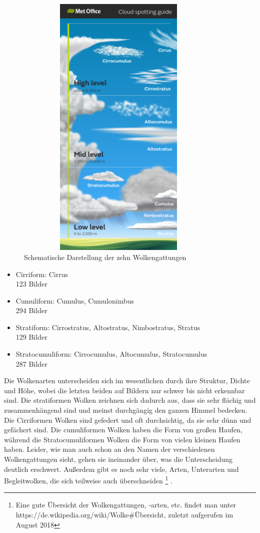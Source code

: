 \documentclass[a4,german]{article}
\begin{document}
\begin{figure}[h!]
\centering
\includegraphics[width=10cm,height=13cm,keepaspectratio]{Cloud_infographic-01.png}
\caption{Schematische Darstellung der zehn Wolkengattungen}
    \label{fig:cloudtypes}
\end{figure}

\begin{itemize}
\item Cirriform: Cirrus\\123 Bilder
\item Cumuliform: Cumulus, Cumulonimbus\\294 Bilder
\item Stratiform: Cirrostratus, Altostratus, Nimbostratus, Stratus\\129 Bilder
\item Stratocumuliform: Cirrocumulus, Altocumulus, Stratocumulus\\287 Bilder
\end{itemize}

Die Wolkenarten unterscheiden sich im wesentlichen durch ihre Struktur, Dichte und Höhe, wobei die letzten beiden auf Bildern nur schwer bis nicht erkennbar sind. Die stratiformen Wolken zeichnen sich dadurch aus, dass sie sehr flächig und zusammenhängend sind und meinst durchgängig den ganzen Himmel bedecken. Die Cirriformen Wolken sind gefedert und oft durchsichtig, da sie sehr dünn und gefächert sind. Die cumuliformen Wolken haben die Form von großen Haufen, während die Stratocumuliformen Wolken die Form von vielen kleinen Haufen haben. Leider, wie man auch schon an den Namen der verschiedenen Wolkengattungen sieht, gehen sie ineinander über, was die Unterscheidung deutlich erschwert. Außerdem gibt es noch sehr viele, Arten, Unterarten und Begleitwolken, die sich teilweise auch überschneiden \footnote{Eine gute Übersicht der Wolkengattungen, -arten, etc. findet man unter\\ https://de.wikipedia.org/wiki/Wolke\#Übersicht, zuletzt aufgerufen im August 2018} . 
\end{document}
